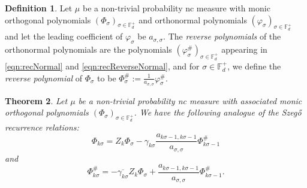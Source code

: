 \documentclass[11pt,reqno]{amsart}
\def\p{\varphi}
\def\g{\gamma}
\def\s{\sigma}
\def\P{\Phi}
\def\FF{\mathbb{F}}
\newtheorem{theorem}{Theorem}[section]
\theoremstyle{definition}
\newtheorem{definition}[theorem]{Definition}
\numberwithin{equation}{section}
\begin{document}
\begin{definition}
    \label{def:reversePolynomials}
    Let \(\mu\) be a non-trivial probability nc measure with monic orthogonal polynomials \((\P_\s)_{\s \in \FF_d^+}\) and orthonormal polynomials \((\p_\s)_{\s \in \FF_d^+}\) and let the leading coefficient of \(\p_\s\) be \(a_{\s,\s}\). The \emph{reverse polynomials} of the orthonormal polynomials are the polynomials \((\p_\s^{\#})_{\s\in\FF_d^+}\) appearing in \eqref{eqn:recNormal} and \eqref{eqn:recReverseNormal}, and for \(\s \in \FF_d^+\), we define the \emph{reverse polynomial} of \(\P_\s\) to be \(\P_\s^{\#} := \frac{1}{a_{\s,\s}}\p_\s^\#\). 
\end{definition}

\begin{theorem}
    \label{thm:NCRecurrences}
    Let \(\mu\) be a non-trivial probability nc measure with associated monic orthogonal polynomials \((\P_\s)_{\s \in \FF_d^+}\). We have the following analogue of the Szeg\H{o} recurrence relations:
    \begin{equation}
        \label{eqn:recMonic}
        \P_{k\s} = Z_k \P_\s - \g_{k\s}\frac{a_{k\s -1, k\s -1}}{a_{\s,\s}} \P^\#_{k\s - 1}
    \end{equation}
    and
    \begin{equation}
        \label{eqn:recReverseMonic}
        \P^\#_{k\s} = -\overline{\g_{k\s}} Z_k \P_\s + \frac{a_{k\s -1, k\s -1}}{a_{\s,\s}}  \P^\#_{k\s - 1}.
    \end{equation}
\end{theorem}
\end{document}
